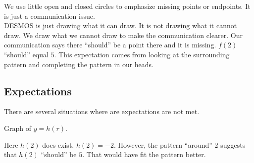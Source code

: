 \documentclass{ximera}
\begin{document}
We use little open and closed circles to emphasize missing points or endpoints.  It is just a communication issue. \\




DESMOS is just drawing what it can draw.  It is not drawing what it cannot draw. We draw what we cannot draw to make the communication clearer. Our communication says there ``should'' be a point there and it is missing. $f(2)$ ``should'' equal $5$.  This expectation comes from looking at the surrounding pattern and completing the pattern in our heads. \\
















\subsection{Expectations}

There are several situations where are expectations are not met.









Graph of $y = h(r)$.

\begin{image}
\end{image}
Here $h(2)$ does exist.  $h(2) = -2$.  However, the pattern ``around'' $2$ suggests that $h(2)$ ``should'' be $5$. That would have fit the pattern better.
\end{document}
